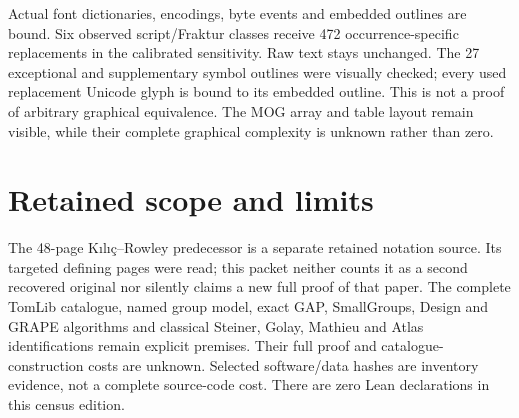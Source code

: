 \documentclass[11pt,a4paper]{article}
\begin{document}
Actual font dictionaries, encodings, byte events and embedded outlines are bound. Six observed script/Fraktur classes receive 472 occurrence-specific replacements in the calibrated sensitivity. Raw text stays unchanged. The 27 exceptional and supplementary symbol outlines were visually checked; every used replacement Unicode glyph is bound to its embedded outline. This is not a proof of arbitrary graphical equivalence. The MOG array and table layout remain visible, while their complete graphical complexity is unknown rather than zero.

\section*{Retained scope and limits}
The 48-page Kılıç--Rowley predecessor is a separate retained notation source. Its targeted defining pages were read; this packet neither counts it as a second recovered original nor silently claims a new full proof of that paper. The complete TomLib catalogue, named group model, exact GAP, SmallGroups, Design and GRAPE algorithms and classical Steiner, Golay, Mathieu and Atlas identifications remain explicit premises. Their full proof and catalogue-construction costs are unknown. Selected software/data hashes are inventory evidence, not a complete source-code cost. There are zero Lean declarations in this census edition.
\end{document}
